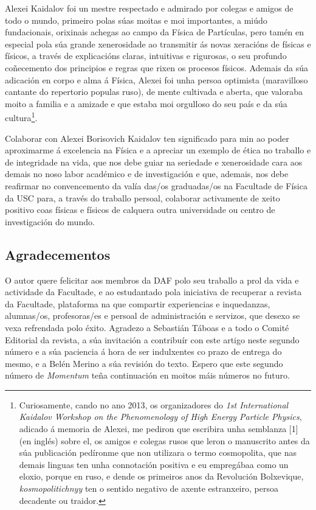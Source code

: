 \begin{refsection}
\begin{multicols}{2}
Alexei Kaidalov foi un mestre respectado e admirado por colegas e amigos de todo o mundo, primeiro
polas súas moitas e moi importantes, a miúdo fundacionais, orixinais achegas ao campo da Física de Partículas, pero tamén en especial pola súa grande xenerosidade ao transmitir ás novas xeracións de físicas e físicos, a través de explicacións claras, intuitivas e rigurosas, o seu profundo coñecemento dos principios e regras que rixen os procesos físicos. Ademais da súa adicación en corpo e alma á Física, Alexei foi unha persoa optimista (maravilloso cantante do repertorio populas ruso), de mente cultivada e aberta, que valoraba moito a familia e a amizade e que estaba moi orgulloso do seu país e da súa cultura\footnote[1]{Curiosamente, cando no ano 2013, os organizadores do \textit{1st International Kaidalov Workshop on the Phenomenology of High Energy Particle Physics}, adicado á memoria de Alexei, me pediron que escribira unha semblanza [1] (en inglés) sobre el, os amigos e colegas rusos que leron o manuscrito antes da súa publicación pedíronme que non utilizara o termo cosmopolita, que nas demais linguas ten unha connotación positiva e eu empregábaa como un eloxio, porque en ruso, e dende os primeiros anos da Revolución Bolxevique, \textit{kosmopolitichnyy} ten o sentido negativo de axente estranxeiro, persoa decadente ou traidor.}.

Colaborar con Alexei Borisovich Kaidalov ten significado para min ao poder aproximarme á excelencia na Física e a apreciar un exemplo de ética no traballo e de integridade na vida, que nos debe guiar na seriedade e xenerosidade cara aos demais no noso labor académico e de investigación e que, ademais, nos debe reafirmar no convencemento da valía das/os graduadas/os na Facultade de Física da USC para, a través do traballo persoal, colaborar activamente de xeito positivo coas físicas e físicos de calquera outra universidade ou centro de investigación do mundo.

\subsection*{Agradecementos}

O autor quere felicitar aos membros da DAF polo seu traballo a prol da vida e actividade da Facultade, e ao estudantado pola iniciativa de recuperar a revista da Facultade, plataforma na que compartir experiencias e inquedanzas, alumnas/os, profesoras/es e persoal de administración e servizos, que desexo se vexa refrendada polo éxito. Agradezo a Sebastián Táboas e a todo o Comité Editorial da revista, a súa invitación a contribuír con este artigo neste segundo número e a súa paciencia á hora de ser indulxentes co prazo de entrega do mesmo, e a Belén Merino a súa revisión do texto. Espero que este segundo número de \textit{Momentum} teña continuación en moitos máis números no futuro. 

\nocite{Merino_2015}

\printbibliography

\end{multicols}
\end{refsection}